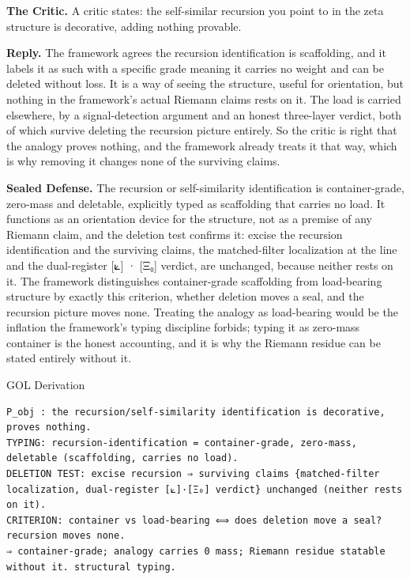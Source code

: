 \documentclass[10pt,twocolumn]{article}
\begin{document}
\textbf{The Critic.} A critic states: the self-similar recursion you
point to in the zeta structure is decorative, adding nothing provable.

\textbf{Reply.} The framework agrees the recursion identification is
scaffolding, and it labels it as such with a specific grade meaning it
carries no weight and can be deleted without loss. It is a way of seeing
the structure, useful for orientation, but nothing in the framework's
actual Riemann claims rests on it. The load is carried elsewhere, by a
signal-detection argument and an honest three-layer verdict, both of
which survive deleting the recursion picture entirely. So the critic is
right that the analogy proves nothing, and the framework already treats
it that way, which is why removing it changes none of the surviving
claims.

\textbf{Sealed Defense.} The recursion or self-similarity identification
is container-grade, zero-mass and deletable, explicitly typed as
scaffolding that carries no load. It functions as an orientation device
for the structure, not as a premise of any Riemann claim, and the
deletion test confirms it: excise the recursion identification and the
surviving claims, the matched-filter localization at the line and the
dual-register {[}⟀{]} · {[}Ξ₀{]} verdict, are unchanged, because neither
rests on it. The framework distinguishes container-grade scaffolding
from load-bearing structure by exactly this criterion, whether deletion
moves a seal, and the recursion picture moves none. Treating the analogy
as load-bearing would be the inflation the framework's typing discipline
forbids; typing it as zero-mass container is the honest accounting, and
it is why the Riemann residue can be stated entirely without it.

\begin{golbox}{GOL Derivation}
\begin{lstlisting}[style=golv]
P_obj : the recursion/self-similarity identification is decorative, proves nothing.
TYPING: recursion-identification = container-grade, zero-mass, deletable (scaffolding, carries no load).
DELETION TEST: excise recursion ⇒ surviving claims {matched-filter localization, dual-register [⟀]·[Ξ₀] verdict} unchanged (neither rests on it).
CRITERION: container vs load-bearing ⟺ does deletion move a seal? recursion moves none.
⇒ container-grade; analogy carries 0 mass; Riemann residue statable without it. structural typing.
\end{lstlisting}
\end{golbox}
\end{document}

